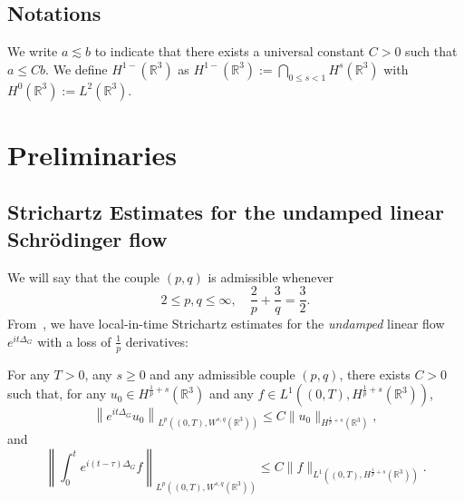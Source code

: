 \documentclass[AHL,Unicode,longabstracts,published]{cedram}
\newcommand*\R{\mathbb{R}}
\begin{document}
\subsection*{Notations}

We write $a \lesssim b$ to indicate that there exists a universal constant $C>0$ such that $a \leq Cb$. We define $H^{1-}(\R^3)$ as $H^{1-}(\R^3) := \bigcap_{0\leq s<1} H^s(\R^3)$ with $H^0(\R^3) := L^2(\R^3)$.


\section{Preliminaries}\label{secPrelim}

\subsection{Strichartz Estimates for the undamped linear Schr{\"o}dinger flow}


We will say that the couple $(p,q)$ is admissible whenever
\begin{equation}\label{eq:StrichS}
2\leq p, q \leq \infty, \quad \frac 2 p + \frac 3 q = \frac 3 2.
\end{equation}
From~\cite{BuGeTz04}, we have local-in-time Strichartz estimates for the \emph{undamped} linear flow $e^{ i t \Delta_G}$ with a loss of $\frac 1p$ derivatives:

\begin{prop}\label{prop:strich}
For any $T >0$, any $s \geq 0$ and any admissible couple $(p,q)$, there exists $C>0$ such that, for any $u_0 \in H^{\frac 1p + s}(\R^3)$ and any $f \in L^1((0,T), H^{\frac 1p + s}(\R^3))$,
\begin{equation}\label{eq:StrLossHom}
\left\| e^{ i t \Delta_G} u_0 \right\|_{L^p\left((0,T),W^{s,q}(\R^3)\right)} \leq C \| u_0 \|_{H^{ \frac 1p + s}(\R^3)},
\end{equation}
and
\begin{equation}\label{eq:NonHomDG}
\left\| \int_0^t e^{i(t- \tau) \Delta_G} f \right\|_{L^p\left((0,T),W^{s,q}(\R^3)\right)} \leq C \| f \|_{L^1\left((0,T), H^{\frac 1p + s}(\R^3)\right)}.
\end{equation}
\end{prop}
\end{document}
